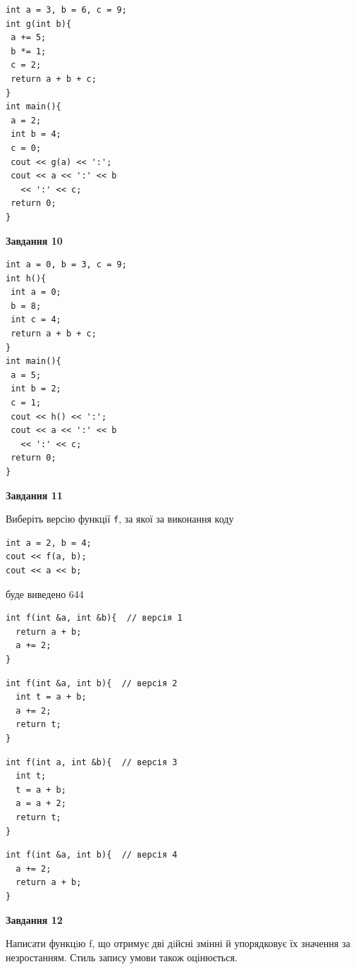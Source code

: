 \documentclass[12pt, ukrainian]{article}
\def\code#1{\Verb!#1!}
\begin{document}
{\begin {large}
\begin{minipage}[t]{7.0cm}
\begin{verbatim}
int a = 3, b = 6, c = 9;
int g(int b){
 a += 5;
 b *= 1;
 c = 2;
 return a + b + c;
}
int main(){
 a = 2;
 int b = 4;
 c = 0;
 cout << g(a) << ':';
 cout << a << ':' << b 
   << ':' << c;
 return 0;
}
\end{verbatim}



\begin{center}
\textbf{Завдання 10}
\end{center}
\vspace{-8mm}

\begin{verbatim}
int a = 0, b = 3, c = 9;
int h(){
 int a = 0;
 b = 8;
 int c = 4;
 return a + b + c;
}
int main(){
 a = 5;
 int b = 2;
 c = 1;
 cout << h() << ':';
 cout << a << ':' << b 
   << ':' << c;
 return 0;
}
\end{verbatim}

\end{minipage}
\vline \hspace{1mm}
\begin{minipage}[t]{11.0cm}

\begin{center}
\textbf{Завдання 11}
\end{center}
Виберіть версію функції \code{f}, за якої за виконання коду
\begin{verbatim}
int a = 2, b = 4;
cout << f(a, b);
cout << a << b;
\end{verbatim}

буде виведено 644

\begin{verbatim}
int f(int &a, int &b){  // версія 1
  return a + b;
  a += 2;
}
\end{verbatim}

\vspace{-8mm}\begin{verbatim}
int f(int &a, int b){  // версія 2
  int t = a + b;
  a += 2;
  return t;
}
\end{verbatim}

\vspace{-8mm}\begin{verbatim}
int f(int a, int &b){  // версія 3
  int t;
  t = a + b;
  a = a + 2;
  return t;
}
\end{verbatim}

\vspace{-8mm}\begin{verbatim}
int f(int &a, int b){  // версія 4
  a += 2;
  return a + b;
}
\end{verbatim}



\begin{center}
\textbf{Завдання 12}
\end{center}

Написати функцiю f, що отримує дві дiйсні змінні й упорядковує їх значення за незростанням. Стиль запису умови також оцінюється.\par

\end{minipage}

\end {large}}
\newpage
\end{document}
